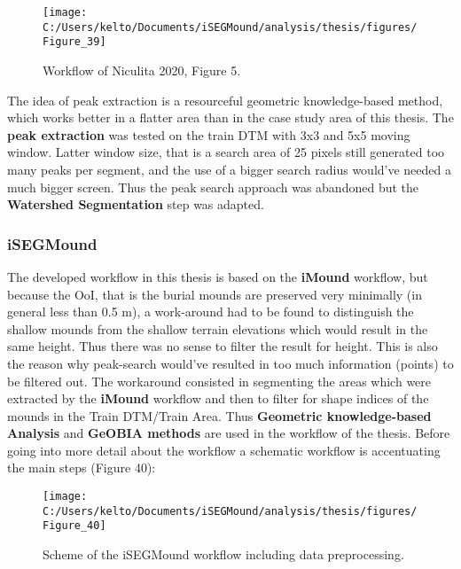 \documentclass[
  12pt,
]{article}
\begin{document}
\begin{figure}

{\centering \texttt{[image: C:/Users/kelto/Documents/iSEGMound/analysis/thesis/figures/Figure\_39]} 

}

\caption{Workflow of Niculita 2020, Figure 5.}\label{fig:Figure39}
\end{figure}

The idea of peak extraction is a resourceful geometric knowledge-based method, which works better in a flatter area than in the case study area of this thesis. The \textbf{peak extraction} was tested on the train DTM with 3x3 and 5x5 moving window. Latter window size, that is a search area of 25 pixels still generated too many peaks per segment, and the use of a bigger search radius would've needed a much bigger screen. Thus the peak search approach was abandoned but the \textbf{Watershed Segmentation} step was adapted.

\hypertarget{isegmound}{%
\subsubsection{\texorpdfstring{\textbf{iSEGMound}}{iSEGMound}}\label{isegmound}}

The developed workflow in this thesis is based on the \textbf{iMound} workflow, but because the OoI, that is the burial mounds are preserved very minimally (in general less than 0.5 m), a work-around had to be found to distinguish the shallow mounds from the shallow terrain elevations which would result in the same height. Thus there was no sense to filter the result for height. This is also the reason why peak-search would've resulted in too much information (points) to be filtered out. The workaround consisted in segmenting the areas which were extracted by the \textbf{iMound} workflow and then to filter for shape indices of the mounds in the Train DTM/Train Area. Thus \textbf{Geometric knowledge-based Analysis} and \textbf{GeOBIA methods} are used in the workflow of the thesis.
Before going into more detail about the workflow a schematic workflow is accentuating the main steps (Figure 40):

\begin{figure}

{\centering \texttt{[image: C:/Users/kelto/Documents/iSEGMound/analysis/thesis/figures/Figure\_40]} 

}

\caption{Scheme of the iSEGMound workflow including data preprocessing.}\label{fig:Figure40}
\end{figure}
\end{document}
